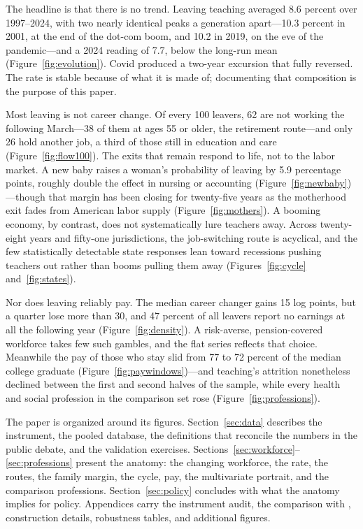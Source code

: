 \documentclass[11pt,a4paper]{article}
\begin{document}
The headline is that there is no trend. Leaving teaching averaged 8.6
percent over 1997--2024, with two nearly identical peaks a generation
apart---10.3 percent in 2001, at the end of the dot-com boom, and 10.2
in 2019, on the eve of the pandemic---and a 2024 reading of 7.7, below
the long-run mean (Figure~\ref{fig:evolution}). Covid produced a
two-year excursion that fully reversed. The rate is stable because of
what it is made of; documenting that composition is the purpose of
this paper.

Most leaving is not career change. Of every 100 leavers, 62 are not
working the following March---38 of them at ages 55 or older, the
retirement route---and only 26 hold another job, a third of those
still in education and care (Figure~\ref{fig:flow100}). The exits that
remain respond to life, not to the labor market. A new baby raises a
woman's probability of leaving by 5.9 percentage points, roughly
double the effect in nursing or accounting
(Figure~\ref{fig:newbaby})---though that margin has been closing for
twenty-five years as the motherhood exit fades from American labor
supply (Figure~\ref{fig:mothers}). A booming economy, by contrast,
does not systematically lure teachers away. Across twenty-eight years
and fifty-one jurisdictions, the job-switching route is acyclical, and
the few statistically detectable state responses lean toward
recessions pushing teachers out rather than booms pulling them away
(Figures~\ref{fig:cycle} and~\ref{fig:states}).

Nor does leaving reliably pay. The median career changer gains 15 log
points, but a quarter lose more than 30, and 47 percent of all leavers
report no earnings at all the following year
(Figure~\ref{fig:density}). A risk-averse, pension-covered workforce
takes few such gambles, and the flat series reflects that choice. Meanwhile
the pay of those who stay slid from 77 to 72 percent of the median
college graduate (Figure~\ref{fig:paywindows})---and teaching's
attrition nonetheless declined between the first and second halves of
the sample, while every health and social profession in the comparison
set rose (Figure~\ref{fig:professions}).

The paper is organized around its figures. Section~\ref{sec:data}
describes the instrument, the pooled database, the definitions that
reconcile the numbers in the public debate, and the validation
exercises. Sections~\ref{sec:workforce}--\ref{sec:professions} present
the anatomy: the changing workforce, the rate, the routes, the family
margin, the cycle, pay, the multivariate portrait, and the comparison
professions. Section~\ref{sec:policy} concludes with what the anatomy
implies for policy. Appendices carry the instrument audit, the
comparison with \citet{harris2007}, construction details, robustness
tables, and additional figures.
\end{document}

